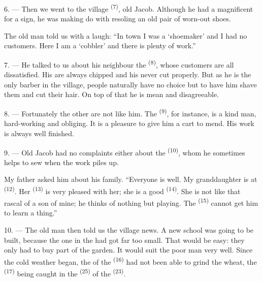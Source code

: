 6. --- Then we went to the village  \textsuperscript{(7)}, old Jacob.
Although he had a magnificent  for a sign, he was making do with resoling an old
pair of worn-out shoes.

The old man told us with a laugh: “In town I was a ‘shoemaker’ and I had no customers. Here I
am a ‘cobbler’ and there is plenty of work.”

7. --- He talked to us about his neighbour the  \textsuperscript{(8)}, whose
customers are all dissatisfied. His  are always chipped and his
 never cut properly. But as he is the only barber in the village, people
naturally have no choice but to have him shave them and cut their hair. On top of that he is
mean and disagreeable.

8. --- Fortunately the other  are not like him. The
 \textsuperscript{(9)}, for instance, is a kind man, hard-working
and obliging. It is a pleasure to give him a cart to mend. His work is always well finished.

9. --- Old Jacob had no complaints either about the  \textsuperscript{(10)},
whom he sometimes helps to sew  when the work piles up.

My father asked him about his family. “Everyone is well. My granddaughter is at
 \textsuperscript{(12)}. Her  \textsuperscript{(13)} is very
pleased with her; she is a good  \textsuperscript{(14)}. She is not like that
rascal of a son of mine; he thinks of nothing but playing. The 
\textsuperscript{(15)} cannot get him to learn a thing.”

\VUsaut{3.0mm}
\VUsaut{3.0mm}

10. --- The old man then told us the village news. A new school was going to be built, because
the one in the  had got far too small. That would be easy: they only had
to buy part of the
 garden. It would suit the poor man very well. Since the
cold weather began, the  of the  \textsuperscript{(16)} had
not been able to grind the wheat, the  \textsuperscript{(17)} being caught in
the  \textsuperscript{(25)} of the
 \textsuperscript{(23)}.

